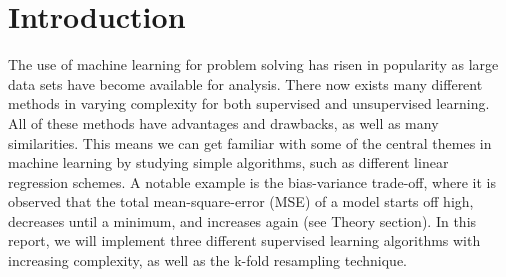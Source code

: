 \section{Introduction}
\label{sec:introduction}

The use of machine learning for problem solving has risen in popularity as large data sets have become available for analysis. There now exists many different methods in varying complexity for both supervised and unsupervised learning. All of these methods have advantages and drawbacks, as well as many similarities. This means we can get familiar with some of the central themes in machine learning by studying simple algorithms, such as different linear regression schemes. A notable example is the bias-variance trade-off, where it is observed that the total mean-square-error (MSE) of a model starts off high, decreases until a minimum, and increases again (see Theory section).
In this report, we will implement three different supervised learning algorithms with increasing complexity, as well as the k-fold resampling technique.